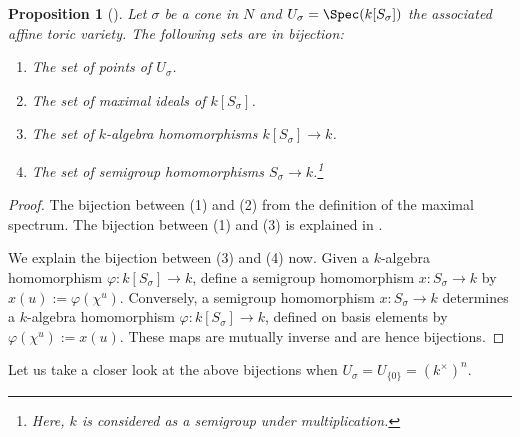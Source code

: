 \documentclass[12pt]{amsart}
\theoremstyle{plain}
\newtheorem{proposition}[theorem]{Proposition}
\begin{document}
\begin{proposition}[{\cite[Proposition 1.3.1]{CLS11}}]\label{proposition:pointbijections}
Let $\sigma$ be a cone in $N$ and $U_\sigma = \Spec(k[S_\sigma])$ the associated affine toric variety.
The following sets are in bijection:
\begin{enumerate}
\item The set of points of $U_\sigma$.
\item The set of maximal ideals of $k[S_\sigma]$.
\item The set of $k$-algebra homomorphisms $k[S_\sigma] \to k$.
\item The set of semigroup homomorphisms $S_\sigma \to k$.\footnote{Here, $k$ is considered as a semigroup under multiplication.}
\end{enumerate}
\end{proposition}

\begin{proof}
The bijection between (1) and (2) from the definition of the maximal spectrum.
The bijection between (1) and (3) is explained in \cite[3.28]{Milne13}.

We explain the bijection between (3) and (4) now.
Given a $k$-algebra homomorphism $\varphi : k[S_\sigma] \to k$, define a semigroup homomorphism $x : S_\sigma \to k$ by $x(u) := \varphi(\chi^u)$.
Conversely, a semigroup homomorphism $x : S_\sigma \to k$ determines a $k$-algebra homomorphism $\varphi : k[S_\sigma] \to k$, defined on basis elements by $\varphi(\chi^u) := x(u)$.
These maps are mutually inverse and are hence bijections.
\end{proof}

Let us take a closer look at the above bijections when $U_\sigma = U_{\{0\}} = (k^\times)^n$.
\end{document}
